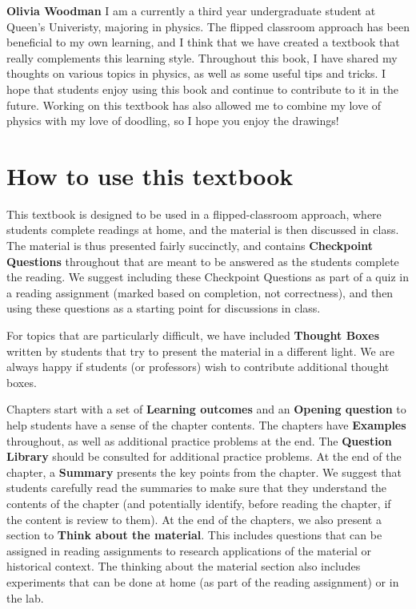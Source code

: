 \textbf{Olivia Woodman} I am a currently a third year undergraduate student at Queen's Univeristy, majoring in physics. The flipped classroom approach has been beneficial to my own learning, and I think that we have created a textbook that really complements this learning style. Throughout this book, I have shared my thoughts on various topics in physics, as well as some useful tips and tricks. I hope that students enjoy using this book and continue to contribute to it in the future. Working on this textbook has also allowed me to combine my love of physics with my love of doodling, so I hope you enjoy the drawings!

\section*{How to use this textbook}
This textbook is designed to be used in a flipped-classroom approach, where students complete readings at home, and the material is then discussed in class. The material is thus presented fairly succinctly, and contains \textbf{Checkpoint Questions} throughout that are meant to be answered as the students complete the reading. We suggest including these Checkpoint Questions as part of a quiz in a reading assignment (marked based on completion, not correctness), and then using these questions as a starting point for discussions in class.

For topics that are particularly difficult, we have included \textbf{Thought Boxes} written by students that try to present the material in a different light. We are always happy if students (or professors) wish to contribute additional thought boxes.

Chapters start with a set of \textbf{Learning outcomes} and an \textbf{Opening question} to help students have a sense of the chapter contents. The chapters have \textbf{Examples} throughout, as well as additional practice problems at the end. The \textbf{Question Library} should be consulted for additional practice problems. At the end of the chapter, a \textbf{Summary} presents the key points from the chapter. We suggest that students carefully read the summaries to make sure that they understand the contents of the chapter (and potentially identify, before reading the chapter, if the content is review to them). At the end of the chapters, we also present a section to \textbf{Think about the material}. This includes questions that can be assigned in reading assignments to research applications of the material or historical context. The thinking about the material section also includes experiments that can be done at home (as part of the reading assignment) or in the lab.

